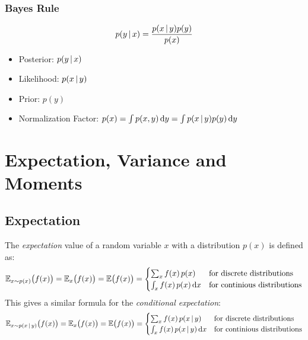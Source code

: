 		\subsubsection{Bayes Rule}
			\begin{equation}
				p(y \,\vert\, x) = \frac{p(x \,\vert\, y) p(y)}{p(x)}
			\end{equation}

			\begin{itemize}
				\item Posterior: \tabto{4cm} \( p(y \,\vert\, x) \)
				\item Likelihood: \tabto{4cm} \( p(x \,\vert\, y) \)
				\item Prior: \tabto{4cm} \( p(y) \)
				\item Normalization Factor: \tabto{4cm} \( p(x) = \int p(x, y) \dd{y} = \int p(x \,\vert\, y) p(y) \dd{y} \)
			\end{itemize}

	\section{Expectation, Variance and Moments}
		\subsection{Expectation}
			The \emph{expectation} value of a random variable \(x\) with a distribution \(p(x)\) is defined as:
			\begin{equation}
				\mathbb{E}_{x \sim p(x)}\big(f(x)\big) = \mathbb{E}_x\big(f(x)\big) = \mathbb{E}\big(f(x)\big) =
				\begin{cases}
					\sum_x f(x) \, p(x)        & \textrm{for discrete distributions}   \\
					\int_x f(x) \, p(x) \dd{x} & \textrm{for continious distributions}
				\end{cases}
			\end{equation}
			This gives a similar formula for the \emph{conditional expectation}:
			\begin{equation}
				\mathbb{E}_{x \sim p(x \,\vert\, y)}\big(f(x)\big) = \mathbb{E}_x\big(f(x)\big) = \mathbb{E}\big(f(x)\big) =
				\begin{cases}
					\sum_x f(x) \, p(x \,\vert\, y)        & \textrm{for discrete distributions}   \\
					\int_x f(x) \, p(x \,\vert\, y) \dd{x} & \textrm{for continious distributions}
				\end{cases}
			\end{equation}

